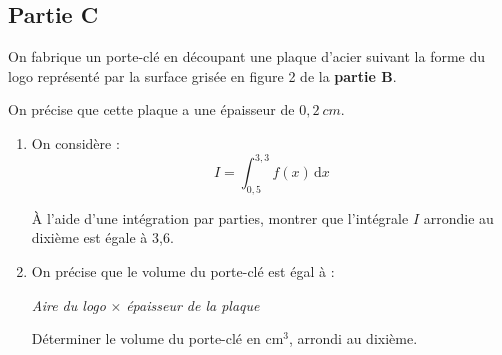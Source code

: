 \documentclass[10pt]{article}
\providecommand{\np}[2][]{{#2~#1}}
\begin{document}
		\subsection*{\centering Partie C}

			On fabrique un porte-clé en découpant une plaque d'acier suivant la forme du logo représenté par la surface grisée en figure 2 de la \textbf{partie B}.

			On précise que cette plaque a une épaisseur de $\np[cm]{0,2}$.

			\begin{enumerate}
				\item On considère :
				\[I=\int_{0,5}^{3,3} f(x) \,\mathrm{d} x\]

				À l'aide d'une intégration par parties, montrer que l'intégrale $I$ arrondie au dixième est égale à 3,6.

				\item On précise que le volume du porte-clé est égal à :

\begin{center}
\emph{Aire du logo} $\times$ \emph{épaisseur de la plaque}
\end{center}

				Déterminer le volume du porte-clé en $\mathrm{cm}^{3}$, arrondi au dixième.
			\end{enumerate}
\end{document}
